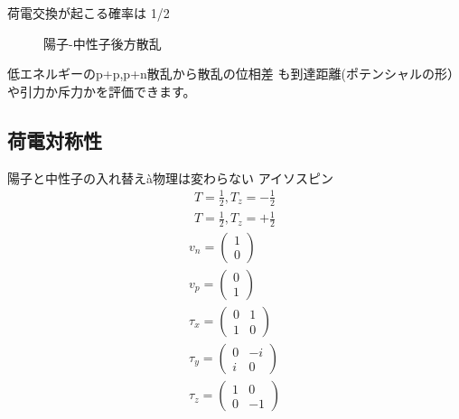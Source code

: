 \documentclass[uplatex,dvipdfmx,a4paper,11pt]{jlreq}
\numberwithin{equation}{section}
\theoremstyle{definition}
\begin{document}
荷電交換が起こる確率は 1/2
\begin{figure}[htpb]
  \centering
  \caption{陽⼦-中性⼦後⽅散乱}
\end{figure}

低エネルギーのp+p,p+n散乱から散乱の位相差
も到達距離(ポテンシャルの形）や引⼒か斥⼒かを評価できます。



\subsection{荷電対称性}
陽⼦と中性⼦の⼊れ替えà物理は変わらない
アイソスピン
\begin{align}
  T = \frac{1}{2}, T_z = -\frac{1}{2} \\
  T = \frac{1}{2}, T_z = +\frac{1}{2}
\end{align}
\begin{align}
  v_n = \begin{pmatrix}
          1 \\ 0
        \end{pmatrix}    \\
  v_p = \begin{pmatrix}
          0 \\ 1
        \end{pmatrix}    \\
  \tau_x = \begin{pmatrix}
             0 & 1 \\
             1 & 0
           \end{pmatrix} \\
  \tau_y = \begin{pmatrix}
             0 & -i \\
             i & 0
           \end{pmatrix} \\
  \tau_z = \begin{pmatrix}
             1 & 0  \\
             0 & -1
           \end{pmatrix} \\
\end{align}
\end{document}
